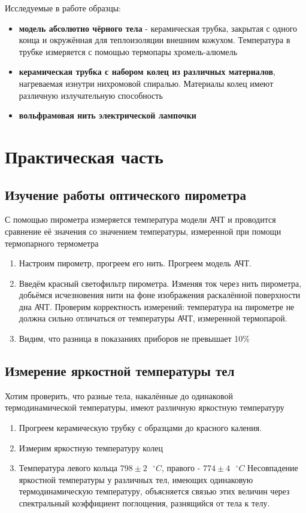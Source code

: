\documentclass[a4paper, 12pt]{article}
\begin{document}
Исследуемые в работе образцы:
\begin{itemize}
    \item \textbf{модель абсолютно чёрного тела} - керамическая трубка, закрытая с одного конца и окружённая для теплоизоляции внешним кожухом. Температура в трубке измеряется с помощью термопары хромель-алюмель
    \item \textbf{керамическая трубка с набором колец из различных материалов}, нагреваемая изнутри нихромовой спиралью. Материалы колец имеют различную излучательную способность
    \item \textbf{вольфрамовая нить электрической лампочки}
\end{itemize}

\newpage

\section{Практическая часть}
\subsection{Изучение работы оптического пирометра}

С помощью пирометра измеряется температура модели АЧТ и проводится сравнение её значения  со значением температуры, измеренной при помощи термопарного термометра
\begin{enumerate}
    \item Настроим пирометр, прогреем его нить. Прогреем модель АЧТ.
    \item Введём красный светофильтр пирометра. Изменяя ток через нить пирометра, добьёмся исчезновения нити на фоне изображения раскалённой поверхности дна АЧТ. Проверим корректность измерений: температура на пирометре не должна сильно отличаться от температуры АЧТ, измеренной термопарой. 
    \item 


Видим, что разница в показаниях приборов не превышает 10\%
\end{enumerate}

\subsection{Измерение яркостной температуры тел}
Хотим проверить, что разные тела, накалённые до одинаковой термодинамической температуры, имеют различную яркостную температуру
\begin{enumerate}
    \item Прогреем керамическую трубку с образцами до красного каления.
    \item Измерим яркостную температуру колец
    \item Температура левого кольца $798 \pm 2 \text{ }^\circ C$, правого - $774 \pm 4 \text{ }^\circ C$
Несовпадение яркостной температуры у различных тел, имеющих одинаковую термодинамическую температуру, объясняется связью этих величин через спектральный коэффициент поглощения, разнящийся от тела к телу.
\end{enumerate}
\end{document}
